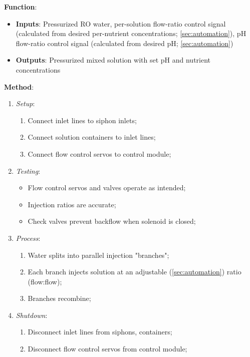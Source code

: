 \documentclass{report}
\begin{document}
\textbf{Function}:
\begin{itemize}
    \item \textbf{Inputs}: Pressurized RO water, per-solution flow-ratio control signal (calculated from desired per-nutrient concentrations; \ref{sec:automation}), pH flow-ratio control signal (calculated from desired pH; \ref{sec:automation})
    \item \textbf{Outputs}: Pressurized mixed solution with set pH and nutrient concentrations
\end{itemize}

\textbf{Method}:
\begin{enumerate}
    \item \textit{Setup}:
    \begin{enumerate}
        \item Connect inlet lines to siphon inlets;
        \item Connect solution containers to inlet lines;
        \item Connect flow control servos to control module;
    \end{enumerate}
    \item \textit{Testing}:
    \begin{itemize}
        \item Flow control servos and valves operate as intended;
        \item Injection ratios are accurate;
        \item Check valves prevent backflow when solenoid is closed;
    \end{itemize}
    \item \textit{Process}:
    \begin{enumerate}
        \item Water splits into parallel injection "branches";
        \item Each branch injects solution at an adjustable (\ref{sec:automation}) ratio (flow:flow);
        \item Branches recombine;
    \end{enumerate}
    \item \textit{Shutdown}:
    \begin{enumerate}
        \item Disconnect inlet lines from siphons, containers;
        \item Disconnect flow control servos from control module;
    \end{enumerate}
\end{enumerate}
\end{document}

